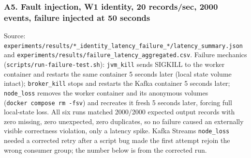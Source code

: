 \hypertarget{a5.-fault-injection-w1-identity-20-recordssec-2000-events-failure-injected-at-50-seconds}{%
\subsubsection{A5. Fault injection, W1 identity, 20 records/sec, 2000
events, failure injected at 50
seconds}\label{a5.-fault-injection-w1-identity-20-recordssec-2000-events-failure-injected-at-50-seconds}}

Source:
\texttt{experiments/results/*\_identity\_latency\_failure\_*/latency\_summary.json}
and \texttt{experiments/results/failure\_latency\_aggregated.csv}.
Failure mechanics (\texttt{scripts/run-failure-test.sh}):
\texttt{jvm\_kill} sends SIGKILL to the worker container and restarts
the same container 5 seconds later (local state volume intact);
\texttt{broker\_kill} stops and restarts the Kafka container 5 seconds
later; \texttt{node\_loss} removes the worker container and its
anonymous volumes (\texttt{docker\ compose\ rm\ -fsv}) and recreates it
fresh 5 seconds later, forcing full local-state loss. All six runs
matched 2000/2000 expected output records with zero missing, zero
unexpected, zero duplicates, so no failure caused an externally visible
correctness violation, only a latency spike. Kafka Streams
\texttt{node\_loss} needed a corrected retry after a script bug made the
first attempt rejoin the wrong consumer group; the number below is from
the corrected run.

